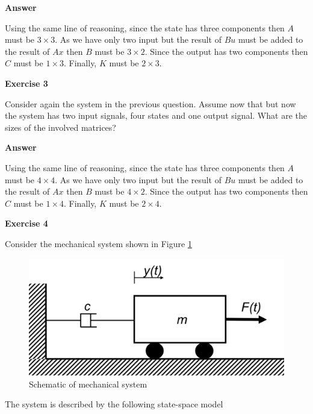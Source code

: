 \textbf{Answer}

Using the same line of reasoning, since the state has three components then $A$ must be $3\times 3$. As we have only two input but the result of $Bu$ must be added to the result of $Ax$ then $B$ must be $3\times 2$. Since the output has two components then $C$ must be $1\times 3$. Finally, $K$ must be $2\times 3$.


\textbf{Exercise 3}

Consider again the system in the previous  question. Assume now that but now the system has two input signals, four states and one output signal. What are the sizes of the involved matrices?

\textbf{Answer}

Using the same line of reasoning, since the state has three components then $A$ must be $4\times 4$. As we have only two input but the result of $Bu$ must be added to the result of $Ax$ then $B$ must be $4\times 2$. Since the output has two components then $C$ must be $1\times 4$. Finally, $K$ must be $2\times 4$.



\textbf{Exercise 4}

Consider the mechanical system shown in Figure \ref{Mechanical_system_3_1_1_ex_4} 


\begin{figure}[!htb]
\begin{center}
\includegraphics[scale=0.280]{img/state_feedback/Mechanical_system_3_1_1_ex_4.png}
\end{center}
\caption{Schematic of mechanical system}
\label{Mechanical_system_3_1_1_ex_4}
\end{figure}

The system is described by the following state-space model

